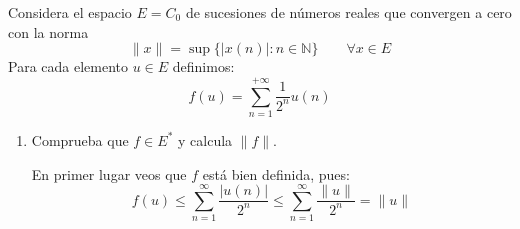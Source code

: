 \begin{ejercicio}
    Considera el espacio $E=C_0$ de sucesiones de números reales que convergen a cero con la norma 
    \begin{equation*}
        \|x\| = \sup\{|x(n)| : n\in \mathbb{N}\} \qquad \forall x\in E
    \end{equation*}
    Para cada elemento $u\in E$ definimos:
    \begin{equation*}
        f(u) = \sum_{n=1}^{+\infty}\dfrac{1}{2^n}u(n)
    \end{equation*}
    \begin{enumerate}[label=\alph*)]
        \item Comprueba que $f\in E^\ast$ y calcula $\|f\|$.

            En primer lugar veos que $f$ está bien definida, pues:
            \begin{equation*}
                f(u) \leq \sum_{n=1}^{\infty}\frac{|u(n)|}{2^n} \leq \sum_{n=1}^{\infty}\frac{\|u\|}{2^n} = \|u\|
            \end{equation*}


\end{enumerate}
\end{ejercicio}
